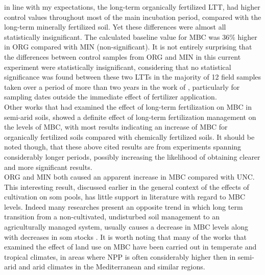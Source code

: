 	in line with my expectations, the long-term organically fertilized LTT, had higher control values throughout most of the main incubation period, compared with the long-term minerally fertilized soil. Yet these differences were almost all statistically insignificant. The calculated baseline value for MBC was 36\% higher in ORG compared with MIN (non-significant). It is not entirely surprising that the differences between control samples from ORG and MIN in this current experiment were statistically insignificant, considering that no statistical significance was found between these  two LTTs in the majority of 12 field samples taken over a period of more than two years in the work of \citet{rotbart2018}, particularly for sampling dates outside the immediate effect of fertilizer application.\\
	Other works that had examined the effect of long-term fertilization on MBC in semi-arid soils, showed a definite effect of long-term fertilization management on the levels of MBC, with most results indicating an increase of MBC for organically fertilized soils compared with chemically fertilized soils\citep{luo2015, liu2013, ghoshal1995}. It should be noted though, that these above cited results are from experiments spanning considerably longer periods, possibly increasing the likelihood of obtaining clearer and more significant results.\\
	ORG and MIN both caused an apparent increase in MBC compared with UNC. This interesting result, discussed earlier in the general context of the effects of cultivation on \gls{som} pools, has little support in literature with regard to MBC levels. Indeed many researches present an opposite trend in which long term transition from a non-cultivated, undisturbed soil management to an agriculturally managed system, usually causes a decrease in MBC levels along with decreases in \gls{som} stocks \citep{benbi2015, yu2013,zhou2018}. It is worth noting that many of the works that examined the effect of land use on MBC have been carried out in temperate and tropical climates, in areas where NPP is often considerably higher then in semi-arid and arid climates in the Mediterranean and similar regions.\\
